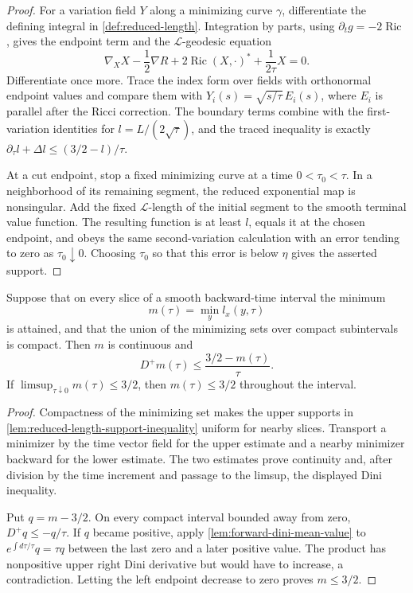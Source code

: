 \begin{proof}
For a variation field $Y$ along a minimizing curve $\gamma$, differentiate
the defining integral in \ref{def:reduced-length}.  Integration by parts,
using $\partial_tg=-2\operatorname{Ric}$, gives the endpoint term and the
$\mathcal L$-geodesic equation
\[
 \nabla_X X-\frac12\nabla R+2\operatorname{Ric}(X,\cdot)^*
 +\frac{1}{2\tau}X=0.
\]
Differentiate once more.  Trace the index form over fields with orthonormal
endpoint values and compare them with
$Y_i(s)=\sqrt{s/\tau}\,E_i(s)$, where $E_i$ is parallel after the Ricci
correction.  The boundary terms combine with the first-variation identities
for $l=L/(2\sqrt\tau)$, and the traced inequality is exactly
$\partial_\tau l+\Delta l\le(3/2-l)/\tau$.

At a cut endpoint, stop a fixed minimizing curve at a time
$0<\tau_0<\tau$.  In a neighborhood of its remaining segment, the reduced
exponential map is nonsingular.  Add the fixed $\mathcal L$-length of the
initial segment to the smooth terminal value function.  The resulting
function is at least $l$, equals it at the chosen endpoint, and obeys the
same second-variation calculation with an error tending to zero as
$\tau_0\downarrow0$.  Choosing $\tau_0$ so that this error is below $\eta$
gives the asserted support.
\end{proof}

\begin{lemma}
\label{lem:minimum-reduced-length-comparison}
\notready
Suppose that on every slice of a smooth backward-time interval the minimum
\[
 m(\tau)=\min_y l_x(y,\tau)
\]
is attained, and that the union of the minimizing sets over compact
subintervals is compact.  Then $m$ is continuous and
\[
 D^+m(\tau)\le\frac{3/2-m(\tau)}{\tau}.
\]
If $\limsup_{\tau\downarrow0}m(\tau)\le3/2$, then
$m(\tau)\le3/2$ throughout the interval.
\end{lemma}

\begin{proof}
Compactness of the minimizing set makes the upper supports in
\ref{lem:reduced-length-support-inequality} uniform for nearby slices.
Transport a minimizer by the time vector field for the upper estimate and a
nearby minimizer backward for the lower estimate.  The two estimates prove
continuity and, after division by the time increment and passage to the
limsup, the displayed Dini inequality.

Put $q=m-3/2$.  On every compact interval bounded away from zero,
$D^+q\le-q/\tau$.  If $q$ became positive, apply
\ref{lem:forward-dini-mean-value} to $e^{\int d\tau/\tau}q=\tau q$ between
the last zero and a later positive value.  The product has nonpositive upper
right Dini derivative but would have to increase, a contradiction.  Letting
the left endpoint decrease to zero proves $m\le3/2$.
\end{proof}

